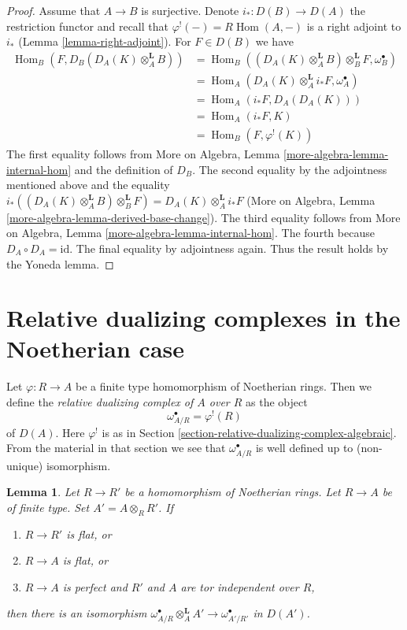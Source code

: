 \documentclass{stacks-project}
\theoremstyle{plain}
\newtheorem{lemma}[subsection]{Lemma}
\theoremstyle{definition}
\theoremstyle{remark}
\numberwithin{equation}{subsection}
\def\Hom{\mathop{\mathrm{Hom}}\nolimits}
\begin{document}
\begin{proof}
\medskip\noindent
Assume that $A \to B$ is surjective. Denote $i_* : D(B) \to D(A)$
the restriction functor and recall that $\varphi^!(-) = R\Hom(A, -)$
is a right adjoint to $i_*$ (Lemma \ref{lemma-right-adjoint}).
For $F \in D(B)$ we have
\begin{align*}
\Hom_B(F, D_B(D_A(K) \otimes_A^\mathbf{L} B))
& =
\Hom_B((D_A(K) \otimes_A^\mathbf{L} B) \otimes_B^\mathbf{L} F,
\omega_B^\bullet) \\
& =
\Hom_A(D_A(K) \otimes_A^\mathbf{L} i_*F, \omega_A^\bullet) \\
& =
\Hom_A(i_*F, D_A(D_A(K))) \\
& =
\Hom_A(i_*F, K) \\
& =
\Hom_B(F, \varphi^!(K))
\end{align*}
The first equality follows from More on Algebra, Lemma
\ref{more-algebra-lemma-internal-hom} and the definition
of $D_B$. The second equality by the adjointness mentioned
above and the equality
$i_*((D_A(K) \otimes_A^\mathbf{L} B) \otimes_B^\mathbf{L} F) =
D_A(K) \otimes_A^\mathbf{L} i_*F$
(More on Algebra, Lemma \ref{more-algebra-lemma-derived-base-change}).
The third equality follows from More on Algebra, Lemma
\ref{more-algebra-lemma-internal-hom}. The fourth because
$D_A \circ D_A = \text{id}$. The final equality by adjointness again.
Thus the result holds by the Yoneda lemma.
\end{proof}






\section{Relative dualizing complexes in the Noetherian case}
\label{section-relative-dualizing-complexes-Noetherian}

\noindent
Let $\varphi : R \to A$ be a finite type homomorphism of
Noetherian rings. Then we define the {\it relative dualizing
complex of $A$ over $R$} as the object
$$
\omega_{A/R}^\bullet = \varphi^!(R)
$$
of $D(A)$. Here $\varphi^!$ is as in
Section \ref{section-relative-dualizing-complex-algebraic}.
From the material in that section we see that
$\omega_{A/R}^\bullet$ is well defined up to (non-unique) isomorphism.

\begin{lemma}
\label{lemma-base-change-relative-algebraic}
Let $R \to R'$ be a homomorphism of Noetherian rings.
Let $R \to A$ be of finite type. Set $A' = A \otimes_R R'$. If
\begin{enumerate}
\item $R \to R'$ is flat, or
\item $R \to A$ is flat, or
\item $R \to A$ is perfect
and $R'$ and $A$ are tor independent over $R$,
\end{enumerate}
then there is an isomorphism
$\omega_{A/R}^\bullet \otimes_A^\mathbf{L} A' \to \omega^\bullet_{A'/R'}$
in $D(A')$.
\end{lemma}
\end{document}
